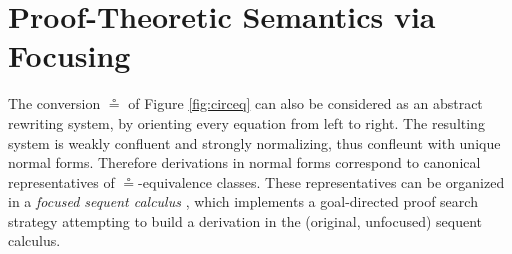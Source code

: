 \documentclass[submission,copyright,creativecommons]{eptcs}
\theoremstyle{definition}
\newcommand{\FSkMCC}{\textsf{Free}}
\begin{document}

\section{Proof-Theoretic Semantics via Focusing}
\label{sec:focus}
The conversion $\circeq$ of Figure \ref{fig:circeq} can also be considered as an abstract rewriting system, by orienting every equation from left to right. The resulting system is weakly confluent and strongly normalizing, thus confleunt with unique normal forms. Therefore derivations in normal forms correspond to canonical representatives of $\circeq$-equivalence classes.
These representatives can be organized in a \emph{focused sequent calculus} \cite{andreoli:logic:1992}, which implements a goal-directed proof search strategy attempting to build a derivation in the (original, unfocused) sequent calculus.
\end{document}
